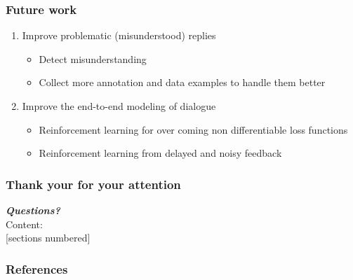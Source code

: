 \documentclass[10pt, compress,british,xcolor={svgnames,dvipsnames,x11names},trans]{beamer}
\begin{document}
\begin{frame}\frametitle{Future work}
    \begin{enumerate}
        \item Improve problematic (misunderstood) replies
            \begin{itemize}
                \item Detect misunderstanding
                \item Collect more annotation and data examples to handle them better
            \end{itemize}
        \item Improve the end-to-end modeling of dialogue
            \begin{itemize}
                \item Reinforcement learning for over coming non differentiable loss functions
                \item Reinforcement learning from delayed and noisy feedback
            \end{itemize}
    \end{enumerate}
\end{frame}




\begin{frame}\frametitle{Thank your for your attention}
    {\bf \large \it Questions?} \\
    \vfill
    Content: \\
  [sections numbered]
  \tableofcontents
\end{frame}

\appendix

\begin{frame}[allowframebreaks]
        \frametitle{References}
        
        
\end{frame}
\end{document}
